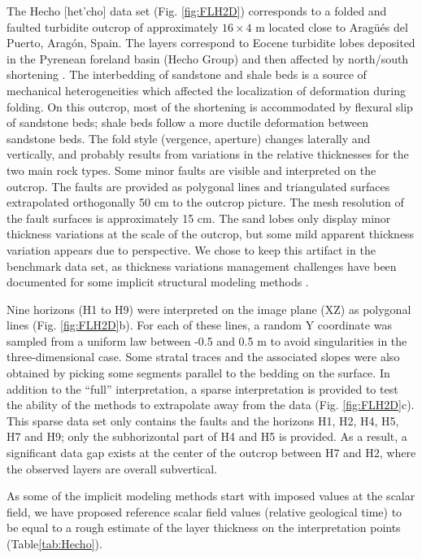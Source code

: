 \documentclass[preprint]{ring20}
\begin{document}
The Hecho [het'cho] data set (Fig. \ref{fig:FLH2D}) corresponds to a folded and faulted turbidite outcrop of approximately $16 \times 4$ m located close to Arag\"u\'es del Puerto, Arag\'on, Spain. The layers correspond to Eocene turbidite lobes deposited in the Pyrenean foreland basin (Hecho Group) and then affected by north/south shortening \citep{Bastida2012JSG}. The interbedding of sandstone and shale beds is a source of mechanical heterogeneities which affected the localization of deformation during folding. On this outcrop, most of the shortening is accommodated by flexural slip of sandstone beds; shale beds follow a more ductile deformation between sandstone beds. The fold style (vergence, aperture) changes laterally and vertically, and probably results from variations in the relative thicknesses for the two main rock types. Some minor faults are visible and interpreted on the outcrop. The faults are provided as polygonal lines and triangulated surfaces extrapolated orthogonally 50 cm to the outcrop picture. The mesh resolution of the fault surfaces is approximately 15 cm. The sand lobes only display minor thickness variations at the scale of the outcrop, but some mild apparent thickness variation appears due to perspective. We chose to keep this artifact in the benchmark data set, as thickness variations management challenges have been documented for some implicit structural modeling methods \citep{Laurent2016EaPSL}. 

Nine horizons (H1 to H9) were interpreted on the image plane (XZ) as polygonal lines (Fig. \ref{fig:FLH2D}b). For each of these lines, a random Y coordinate was sampled from a uniform law between -0.5 and 0.5 m to avoid singularities in the three-dimensional case. Some stratal traces and the associated slopes were also obtained by picking some segments parallel to the bedding on the surface. In addition to the ``full'' interpretation, a sparse interpretation is provided to test the ability of the methods to extrapolate away from the data (Fig. \ref{fig:FLH2D}c). This sparse data set only contains the faults and the horizons H1, H2, H4, H5, H7 and H9; only the subhorizontal part of H4 and H5 is provided. As a result, a significant data gap exists at the center of the outcrop between H7 and H2, where the observed layers are overall subvertical.

As some of the implicit modeling methods start with imposed values at the scalar field, we have proposed reference scalar field values (relative geological time) to be equal to a rough estimate of the layer thickness on the interpretation points (Table\ref{tab:Hecho}).
\end{document}

